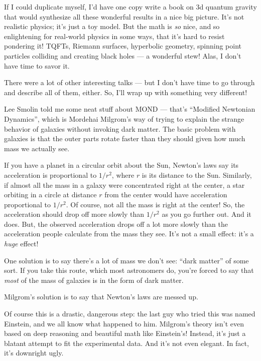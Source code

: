 \documentclass{article}
\begin{document}
If I could duplicate myself, I'd have one copy write a book on 3d
quantum gravity that would synthesize all these wonderful results in a
nice big picture. It's not realistic physics; it's just a toy model. But
the math is \emph{so} nice, and so enlightening for real-world physics
in some ways, that it's hard to resist pondering it! TQFTs, Riemann
surfaces, hyperbolic geometry, spinning point particles colliding and
creating black holes --- a wonderful stew! Alas, I don't have time to
savor it.

There were a lot of other interesting talks --- but I don't have time to
go through and describe all of them, either. So, I'll wrap up with
something very different!

Lee Smolin told me some neat stuff about MOND --- that's ``Modified
Newtonian Dynamics'', which is Mordehai Milgrom's way of trying to
explain the strange behavior of galaxies without invoking dark matter.
The basic problem with galaxies is that the outer parts rotate faster
than they should given how much mass we actually see.

If you have a planet in a circular orbit about the Sun, Newton's laws
say its acceleration is proportional to \(1/r^2\), where \(r\) is its
distance to the Sun. Similarly, if almost all the mass in a galaxy were
concentrated right at the center, a star orbiting in a circle at
distance \(r\) from the center would have acceleration proportional to
\(1/r^2\). Of course, not all the mass is right at the center! So, the
acceleration should drop off more slowly than \(1/r^2\) as you go
further out. And it does. But, the observed acceleration drops off a lot
more slowly than the acceleration people calculate from the mass they
see. It's not a small effect: it's a \emph{huge} effect!

One solution is to say there's a lot of mass we don't see: ``dark
matter'' of some sort. If you take this route, which most astronomers
do, you're forced to say that \emph{most} of the mass of galaxies is in
the form of dark matter.

Milgrom's solution is to say that Newton's laws are messed up.

Of course this is a drastic, dangerous step: the last guy who tried this
was named Einstein, and we all know what happened to him. Milgrom's
theory isn't even based on deep reasoning and beautiful math like
Einstein's! Instead, it's just a blatant attempt to fit the experimental
data. And it's not even elegant. In fact, it's downright ugly.
\end{document}
